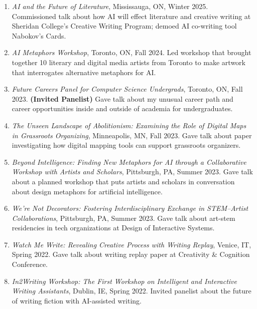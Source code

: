 \begin{enumerate}
 \item  \emph{AI and the Future of Literature}, Mississauga, ON, Winter 2025. \subitem Commissioned talk about how AI will effect literature and creative writing at Sheridan College's Creative Writing Program; demoed AI co-writing tool Nabokov's Cards.
 
 \item  \emph{AI Metaphors Workshop}, Toronto, ON, Fall 2024. \subitem Led workshop that brought together 10 literary and digital media artists from Toronto to make artwork that interrogates alternative metaphors for AI.
  
 \item \emph{Future Careers Panel for Computer Science Undergrads}, Toronto, ON, Fall 2023. \textbf{(Invited Panelist)}  \subitem Gave talk about my unusual career path and career opportunities inside and outside of academia for undergraduates.
 
 \item  \emph{The Unseen Landscape of Abolitionism: Examining the Role of Digital Maps in Grassroots Organizing}, Minneapolis, MN, Fall 2023. \subitem Gave talk about paper investigating how digital mapping tools can support grassroots organizers. \\
 
 \item  \emph{Beyond Intelligence: Finding New Metaphors for AI through a Collaborative Workshop with Artists and Scholars}, Pittsburgh, PA, Summer 2023. \subitem Gave talk about a planned workshop that puts artists and scholars in conversation about design metaphors for artificial intelligence. \\
	
	\item  \emph{We're Not Decorators: Fostering Interdisciplinary Exchange in STEM--Artist Collaborations}, Pittsburgh, PA, Summer 2023. \subitem Gave talk about art-stem residencies in tech organizations at Design of Interactive Systems. \\
 
 	\item  \emph{Watch Me Write: Revealing Creative Process with Writing Replay}, Venice, IT, Spring 2022. \subitem Gave talk about writing replay paper at Creativity \& Cognition Conference. \\
         
      \item  \emph{In2Writing Workshop: The First Workshop on Intelligent and Interactive Writing Assistants}, Dublin, IE, Spring 2022. \subitem Invited panelist about the future of writing fiction with AI-assisted writing.\\
      

\end{enumerate}
